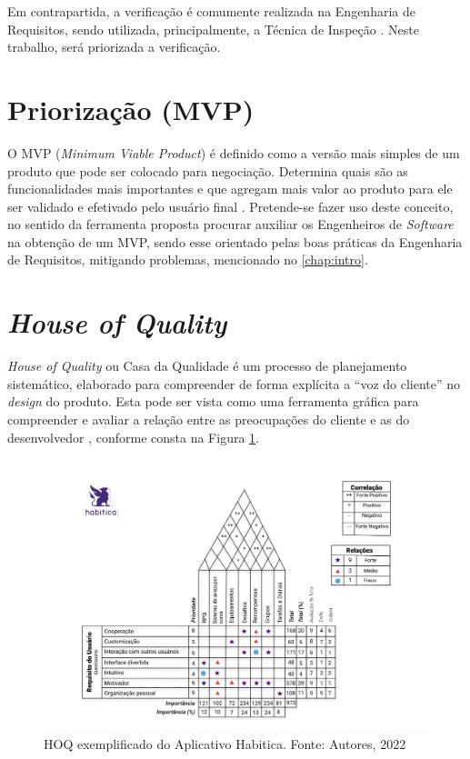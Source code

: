 Em contrapartida, a verificação é comumente realizada na Engenharia de Requisitos, sendo utilizada, principalmente, a Técnica de Inspeção \cite{design_fagan} \cite{verification_MR}. Neste trabalho, será priorizada a verificação.

\section{Priorização (MVP)}

\label{sec:priorizacao}

O MVP (\textit{Minimum Viable Product}) é definido como a versão mais simples de um produto que pode ser colocado para negociação. Determina quais são as funcionalidades mais importantes e que agregam mais valor ao produto para ele ser validado e efetivado pelo usuário final \cite{carolipaulo2018}. Pretende-se fazer uso deste conceito, no sentido da ferramenta proposta procurar auxiliar os Engenheiros de \textit{Software} na obtenção de um MVP, sendo esse orientado pelas boas práticas da Engenharia de Requisitos, mitigando problemas, mencionado no \autoref{chap:intro}.

\section{\textit{House of Quality}}

\label{sec:house_of_quality}

\textit{House of Quality} ou Casa da Qualidade é um processo de planejamento sistemático, elaborado para compreender de forma explícita a “voz do cliente” no \textit{design} do produto. Esta pode ser vista como uma ferramenta gráfica para compreender e avaliar a relação entre as preocupações do cliente e as do desenvolvedor \cite{Howard_1}, conforme consta na Figura \ref{fig:hoq}.

\begin{figure}[H]
    \begin{center}
        \includegraphics[scale=0.5]{figuras/referencial_teorico/HOQ.jpg}
        \caption{{HOQ exemplificado do Aplicativo Habitica. Fonte: Autores, 2022}}
        \label{fig:hoq}
    \end{center}
\end{figure}

